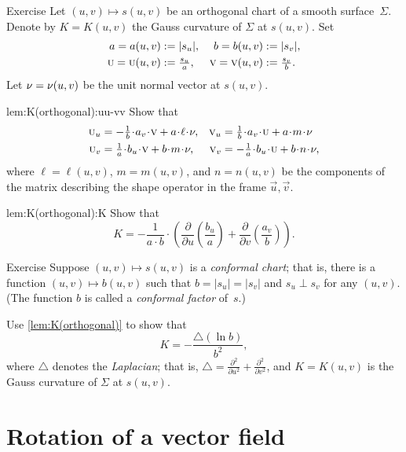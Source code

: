\begin{thm}{Exercise}\label{lem:K(orthogonal)}
Let $(u,v)\mapsto s(u,v)$ be an orthogonal chart of a smooth surface~$\Sigma$.
Denote by $K=K(u,v)$ the Gauss curvature of $\Sigma$ at $s(u,v)$.
Set 
\begin{align*}
a=a(u,v)&\mathrel{:=}|s_u|,&
b=b(u,v)&\mathrel{:=}|s_v|,\\
\text{\sc{u}}=\text{\sc{u}}(u,v)&\mathrel{:=}\tfrac{s_u}a,&
\text{\sc{v}}=\text{\sc{v}}(u,v)&\mathrel{:=}\tfrac{s_v}b.
\end{align*}
Let $\nu=\nu(u,v)$ be the unit normal vector at $s(u,v)$.

\begin{subthm}{lem:K(orthogonal):uu-vv}
Show that 
\[
\begin{aligned}
\vec u_u
&=
-\tfrac1{b}\cdot a_v
\cdot
\vec v 
+
a\cdot \ell\cdot \Norm
,
&
\vec v_u
&=
\tfrac1{b}\cdot a_v
\cdot \vec u
+
a\cdot m\cdot \Norm
\\
\vec u_v
&=
\tfrac1{a}\cdot b_u\cdot\vec v
+
b\cdot m\cdot \Norm
,
&
\vec v_v
&=
-\tfrac1{a}\cdot b_u\cdot\vec u
+
b\cdot n\cdot \Norm,
\end{aligned}
\]
where $\ell=\ell(u,v)$, $m=m(u,v)$, and $n=n(u,v)$ be the components of the matrix describing the shape operator in the frame $\vec u, \vec v$.
\end{subthm}

\begin{subthm}{lem:K(orthogonal):K}
Show that
\[K=-\frac1{a\cdot b}\cdot
\left(
\frac{\partial}{\partial u}
\left(\frac{b_u}a \right)
+
\frac{\partial}{\partial v}
\left(\frac{a_v}b\right)
\right).\]
\end{subthm}
\end{thm}


\begin{thm}{Exercise}\label{ex:conformal}
Suppose $(u,v)\mapsto s(u,v)$ is a \emph{conformal chart};
that is, there is a function $(u,v)\mapsto b(u,v)$ such that $b=|s_u|=|s_v|$ and $s_u\perp s_v$ for any $(u,v)$.
(The function $b$ is called a \emph{conformal factor} of~$s$.)

Use \ref{lem:K(orthogonal)} to show that  
\[K=-\frac{\triangle (\ln b)}{b^2},\]
where $\triangle$ denotes the \emph{Laplacian}; that is, $\triangle=\tfrac{\partial^2}{\partial u^2}+\tfrac{\partial^2}{\partial v^2}$, and 
 $K=K(u,v)$ is the Gauss curvature of $\Sigma$ at $s(u,v)$.
\end{thm}

\section{Rotation of a vector field}

